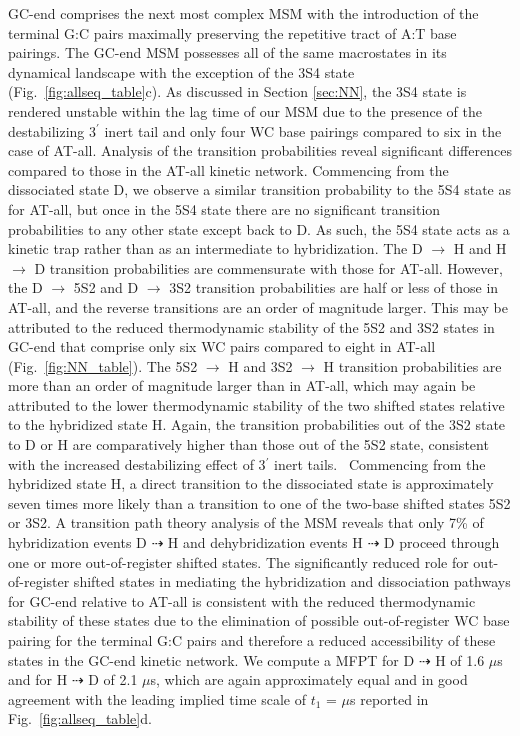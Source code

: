 \documentclass[journal=jpcbfk,manuscript=article]{achemso}
\newcommand*{\rood}[1]{{\color{red}{#1}}}
\begin{document}
GC-end comprises the next most complex MSM with the introduction of the terminal G:C pairs maximally preserving the repetitive tract of A:T base pairings. The GC-end MSM possesses all of the same macrostates in its dynamical landscape with the exception of the 3S4 state (Fig.~\ref{fig:allseq_table}c). As discussed in Section \ref{sec:NN}, the 3S4 state is rendered unstable within the lag time of our MSM due to the presence of the destabilizing 3$^\prime$ inert tail and only four WC base pairings compared to six in the case of AT-all. Analysis of the transition probabilities reveal significant differences compared to those in the AT-all kinetic network. Commencing from the dissociated state D, we observe a similar transition probability to the 5S4 state as for AT-all, but once in the 5S4 state there are no significant transition probabilities to any other state except back to D. As such, the 5S4 state acts as a kinetic trap rather than as an intermediate to hybridization. The D $\rightarrow$ H and H $\rightarrow$ D transition probabilities are commensurate with those for AT-all. However, the D $\rightarrow$ 5S2 and D $\rightarrow$ 3S2 transition probabilities are half or less of those in AT-all, and the reverse transitions are an order of magnitude larger. This may be attributed to the reduced thermodynamic stability of the 5S2 and 3S2 states in GC-end that comprise only six WC pairs compared to eight in AT-all (Fig.~\ref{fig:NN_table}). The 5S2 $\rightarrow$ H and 3S2 $\rightarrow$ H transition probabilities are more than an order of magnitude larger than in AT-all, which may again be attributed to the lower thermodynamic stability of the two shifted states relative to the hybridized state H. Again, the transition probabilities out of the 3S2 state to D or H are comparatively higher than those out of the 5S2 state, consistent with the increased destabilizing effect of 3$^\prime$ inert tails.~\citep{Doktycz1990ThermodynamicATGC, Dickman2012ThermodynamicDNAs, Michele2014EHybridization} Commencing from the hybridized state H, a direct transition to the dissociated state is approximately seven times more likely than a transition to one of the two-base shifted states 5S2 or 3S2. A transition path theory analysis of the MSM reveals that only 7\% of hybridization events D $\dashrightarrow$ H and dehybridization events H $\dashrightarrow$ D proceed through one or more out-of-register shifted states. The significantly reduced role for out-of-register shifted states in mediating the hybridization and dissociation pathways for GC-end relative to AT-all is consistent with the reduced thermodynamic stability of these states due to the elimination of possible out-of-register WC base pairing for the terminal G:C pairs and therefore a reduced accessibility of these states in the GC-end kinetic network. We compute a MFPT for D $\dashrightarrow$ H of 1.6 $\mu$s and for H $\dashrightarrow$ D of 2.1 $\mu$s, which are again approximately equal and in good agreement with the leading implied time scale of $t_1$ = \rood{XX} $\mu$s reported in Fig.~\ref{fig:allseq_table}d.
\end{document}
